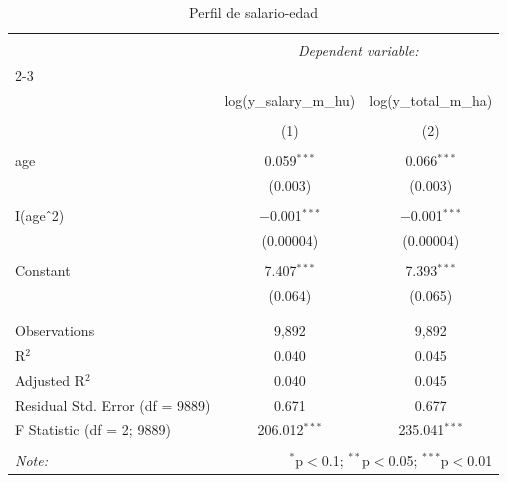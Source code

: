 \documentclass[12pt,a4paper,onecolumn]{article}
\begin{document}
\begin{table}[!htbp] 
\centering 
  \caption{Perfil de salario-edad} 
  \label{reg_punto3} 
\scriptsize
\begin{tabular}{@{\extracolsep{5pt}}lcc} 
\\[-1.8ex]\hline 
\hline \\[-1.8ex] 
 & \multicolumn{2}{c}{\textit{Dependent variable:}} \\ 
\cline{2-3} 
\\[-1.8ex] & log(y\_salary\_m\_hu) & log(y\_total\_m\_ha) \\ 
\\[-1.8ex] & (1) & (2)\\ 
\hline \\[-1.8ex] 
 age & 0.059$^{***}$ & 0.066$^{***}$ \\ 
  & (0.003) & (0.003) \\ 
  & & \\ 
 I(age$\hat{\mkern6mu}$2) & $-$0.001$^{***}$ & $-$0.001$^{***}$ \\ 
  & (0.00004) & (0.00004) \\ 
  & & \\ 
 Constant & 7.407$^{***}$ & 7.393$^{***}$ \\ 
  & (0.064) & (0.065) \\ 
  & & \\ 
\hline \\[-1.8ex] 
Observations & 9,892 & 9,892 \\ 
R$^{2}$ & 0.040 & 0.045 \\ 
Adjusted R$^{2}$ & 0.040 & 0.045 \\ 
Residual Std. Error (df = 9889) & 0.671 & 0.677 \\ 
F Statistic (df = 2; 9889) & 206.012$^{***}$ & 235.041$^{***}$ \\ 
\hline 
\hline \\[-1.8ex] 
\textit{Note:}  & \multicolumn{2}{r}{$^{*}$p$<$0.1; $^{**}$p$<$0.05; $^{***}$p$<$0.01} \\ 
\end{tabular} 
\end{table} 
\end{document}
